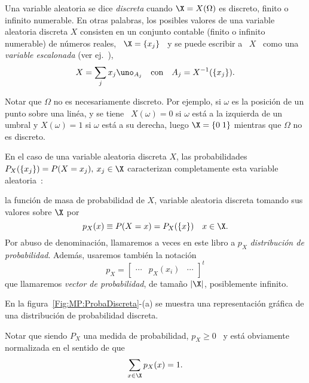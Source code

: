 \begin{definicion}
\label{Def:MP:VariableAleatoriaDiscreta}
%
Una  variable  aleatoria se  dice  {\it discreta}  cuando  $\X  = X(\Omega)$  es
discreto, finito o  infinito numerable. En otras palabras,  los posibles valores
de una variable aleatoria discreta $X$ consisten en un conjunto contable (finito
o infinito  numerable) de  n\'umeros reales, \  $\X =  \{ x_j \}$  \ y  se puede
escribir a \  $X$ \ como una {\it  variable escalonada} (ver ej.~\cite{AthLah06,
  HogMck13}),
  \[
  X = \sum_j x_j \uno_{A_j} \quad \mbox{con} \quad A_j = X^{-1}(\{ x_j \}).
  \]
\end{definicion}
%
\noindent Notar  que $\Omega$  no es necesariamente  discreto.  Por  ejemplo, si
$\omega$ es la posici\'on de un punto sobre una lin\'ea, y se tiene \ $X(\omega)
=  0$ si  $\omega$ est\'a  a la  izquierda de  un umbral  y $X(\omega)  =  1$ si
$\omega$ est\'a a su derecha, luego $\X = \{ 0 \; 1 \}$ mientras que $\Omega$ no
es discreto.

En el  caso de una variable  aleatoria discreta $X$,  las probabilidades $P_X(\{
x_j \})  = P(X = x_j), \:  x_j \in \X$ caracterizan  completamente esta variable
aleatoria~\cite{AshDol99, AthLah06, HogMck13}:
%
\begin{definicion}
\label{Def:MP:MasaProbabilidad}
%
   la  funci\'on  de  masa de  probabilidad  de $X$,  variable
  aleatoria discreta tomando sus valores sobre $\X$ por
  \[
  p_X(x) \equiv P(X = x) = P_X( \{ x\} ) \quad x \in \X.
  \]
  Por   abuso  de   denominaci\'on,  llamaremos a veces  en  este   libro a   $p_X$  {\it
    distribuci\'on de probabilidad}. Adem\'as, usaremos tambi\'en la notaci\'on
  \[
  p_X = \begin{bmatrix} \cdots & p_X(x_i) & \cdots \end{bmatrix}^t
  \]
  que llamaremos {\it vector  de probabilidad}, de tama\~no $|\X|$, posiblemente
  infinito.
\end{definicion}
%
En  la  figura~\ref{Fig:MP:ProbaDiscreta}-(a)  se muestra  una  representaci\'on
gr\'afica de una distribuci\'on de probabilidad discreta.

Notar  que siendo  $P_X$ una  medida de  probabilidad, $p_X  \ge 0$  \  y est\'a
obviamente normalizada en el sentido de que
%
\[
\sum_{x \in \X} p_X(x) = 1.
\]
%

